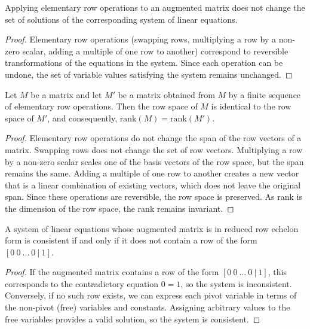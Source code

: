 \begin{lemma}
    \label{lem:Invariance_of_Solution_Set}
    Applying elementary row operations to an augmented matrix does not change the set of solutions of the corresponding system of linear equations.
\end{lemma}

\begin{proof}
    Elementary row operations (swapping rows, multiplying a row by a non-zero scalar, adding a multiple of one row to another) correspond to reversible transformations of the equations in the system. Since each operation can be undone, the set of variable values satisfying the system remains unchanged.
\end{proof}

\begin{lemma}
    \label{lem:Rank_Invariance_under_Row_Operations}
    Let $M$ be a matrix and let $M'$ be a matrix obtained from $M$ by a finite sequence of elementary row operations. Then the row space of $M$ is identical to the row space of $M'$, and consequently, $\text{rank}(M) = \text{rank}(M')$.
\end{lemma}

\begin{proof}
    Elementary row operations do not change the span of the row vectors of a matrix. Swapping rows does not change the set of row vectors. Multiplying a row by a non-zero scalar scales one of the basis vectors of the row space, but the span remains the same. Adding a multiple of one row to another creates a new vector that is a linear combination of existing vectors, which does not leave the original span. Since these operations are reversible, the row space is preserved. As rank is the dimension of the row space, the rank remains invariant.
\end{proof}

\begin{lemma}
    \label{lem:Consistency_Condition_RREF}
    A system of linear equations whose augmented matrix is in reduced row echelon form is consistent if and only if it does not contain a row of the form $[0 \ 0 \ \dots \ 0 \ | \ 1]$.
\end{lemma}

\begin{proof}
    If the augmented matrix contains a row of the form $[0 \ 0 \ \dots \ 0 \ | \ 1]$, this corresponds to the contradictory equation $0=1$, so the system is inconsistent. Conversely, if no such row exists, we can express each pivot variable in terms of the non-pivot (free) variables and constants. Assigning arbitrary values to the free variables provides a valid solution, so the system is consistent.
\end{proof}


